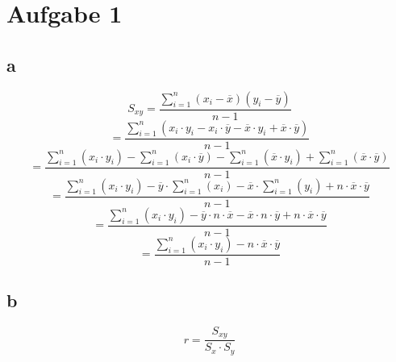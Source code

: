 
\section{Aufgabe 1}
\subsection{a}
\[ S_{xy} 
= \frac{\sum_{i=1}^{n}(x_i - \overline{x})(y_i - \overline{y})}{n - 1} \]
\[ = \frac{\sum_{i=1}^{n}(x_i \cdot y_i - x_i \cdot \overline{y} - 
\overline{x} \cdot y_i + \overline{x} \cdot \overline{y})}{n - 1} \]
\[ = \frac{\sum_{i=1}^{n}(x_i \cdot y_i)
 - \sum_{i=1}^{n}(x_i \cdot \overline{y})
 - \sum_{i=1}^{n}(\overline{x} \cdot y_i) 
 + \sum_{i=1}^{n}(\overline{x} \cdot \overline{y})}{n-1} \]
\[ = \frac{\sum_{i=1}^{n}(x_i \cdot y_i)
 - \overline{y} \cdot \sum_{i=1}^{n}(x_i)
 - \overline{x} \cdot \sum_{i=1}^{n}(y_i) 
 + n \cdot \overline{x} \cdot \overline{y}}{n-1} \]
\[ = \frac{\sum_{i=1}^{n}(x_i \cdot y_i)
 - \overline{y} \cdot n \cdot \overline{x}
 - \overline{x} \cdot n \cdot \overline{y} 
 + n \cdot \overline{x} \cdot \overline{y}}{n-1} \]
\[ = \frac{\sum_{i=1}^{n}(x_i \cdot y_i)
 - n \cdot \overline{x} \cdot \overline{y}}{n-1} \]

\subsection{b}
\[ r = \frac{S_{xy}}{S_x \cdot S_y} \]

